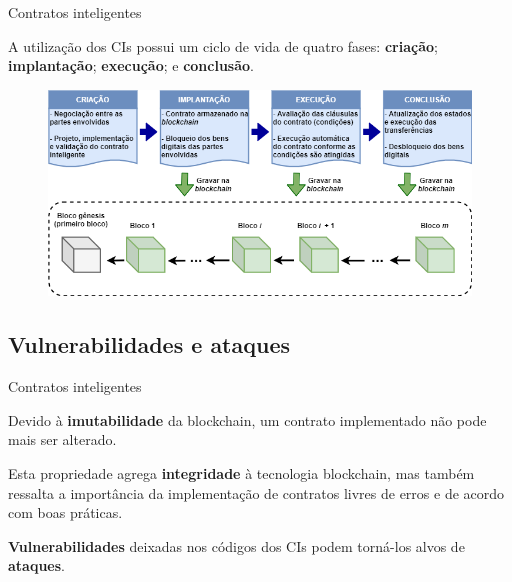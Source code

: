 \begin{frame}{Contratos inteligentes}
    \begin{block}{}
    A utilização dos CIs possui um ciclo de vida de quatro fases: \textbf{criação}; \textbf{implantação}; \textbf{execução}; e \textbf{conclusão}.
    \end{block}
    \begin{figure}[!htb]
        \centering
        \includegraphics[scale=0.4]{figuras/contratos-inteligentes/contrato_ciclo_de_vida.png}
    \end{figure}    
\end{frame}

\subsection{Vulnerabilidades e ataques}

\begin{frame}{Contratos inteligentes}
    \begin{block}{}
    Devido à \textbf{imutabilidade} da blockchain, um contrato implementado não pode mais ser alterado.
    \end{block}
    \begin{block}{}
    Esta propriedade agrega \textbf{integridade} à tecnologia blockchain, mas também ressalta a importância da implementação de contratos livres de erros e de acordo com boas práticas.
    \end{block}
    \begin{alertblock}{}
    \textbf{Vulnerabilidades} deixadas nos códigos dos CIs podem torná-los alvos de \textbf{ataques}.
    \end{alertblock}
\end{frame}

